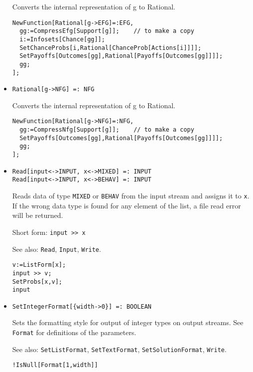 \begin{itemize}
\bd 
Converts the internal representation of g to Rational.  
\begin{verbatim}
NewFunction[Rational[g->EFG]=:EFG,
  gg:=CompressEfg[Support[g]];    // to make a copy
  i:=Infosets[Chance[gg]];
  SetChanceProbs[i,Rational[ChanceProb[Actions[i]]]];
  SetPayoffs[Outcomes[gg],Rational[Payoffs[Outcomes[gg]]]];
  gg;
];  
\end{verbatim} 
\ed

\item{}
\protect \large \begin{verbatim}
Rational[g->NFG] =: NFG 
\end{verbatim}\normalsize

\bd 
Converts the internal representation of g to Rational.  
\begin{verbatim}
NewFunction[Rational[g->NFG]=:NFG,
  gg:=CompressNfg[Support[g]];    // to make a copy
  SetPayoffs[Outcomes[gg],Rational[Payoffs[Outcomes[gg]]]];
  gg;
];  
\end{verbatim} 
\ed

\item{}
\protect \large \begin{verbatim}
Read[input<->INPUT, x<->MIXED] =: INPUT 
Read[input<->INPUT, x<->BEHAV] =: INPUT 
\end{verbatim}\normalsize

\bd 
Reads data of type \verb+MIXED+ or \verb+BEHAV+ from the input
stream and assigns it to \verb+x+.  If the wrong data type is found
for any element of the list, a file read error will be returned.
\item [Short form:] \verb+input >> x+
\item [See also:] \verb+Read+, \verb+Input+, \verb+Write+.
\begin{verbatim}
v:=ListForm[x];
input >> v;
SetProbs[x,v];
input
\end{verbatim} 
\ed


\item{}
\protect \large \begin{verbatim}
SetIntegerFormat[{width->0}] =: BOOLEAN 
\end{verbatim}\normalsize

\bd 
Sets the formatting style for output of integer types on output
streams.  See \verb+Format+ for definitions of the parameters.
\item [See also:] \verb+SetListFormat+, \verb+SetTextFormat+, 
\verb+SetSolutionFormat+, \verb+Write+.
\begin{verbatim}
!IsNull[Format[1,width]]
\end{verbatim} 
\ed


\end{itemize}
